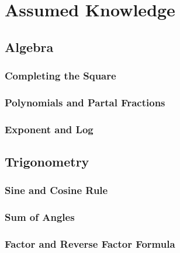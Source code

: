 \documentclass[../main]{subfiles}
\begin{document}
\section{Assumed Knowledge}

\subsection{Algebra}

	\subsubsection{Completing the Square}
	\subsubsection{Polynomials and Partal Fractions}
	\subsubsection{Exponent and Log}

\subsection{Trigonometry}
	
	\subsubsection{Sine and Cosine Rule}
	\subsubsection{Sum of Angles}
	\subsubsection{Factor and Reverse Factor Formula}
\end{document}
